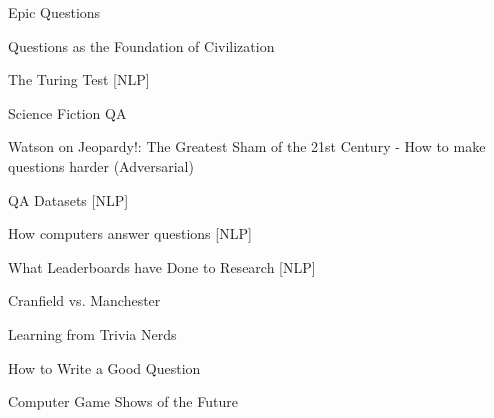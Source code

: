 Epic Questions

Questions as the Foundation of Civilization

The Turing Test [NLP]

Science Fiction QA

Watson on Jeopardy!: The Greatest Sham of the 21st Century 
 - How to make questions harder (Adversarial)

QA Datasets [NLP]

How computers answer questions [NLP]

What Leaderboards have Done to Research [NLP]

Cranfield vs. Manchester

Learning from Trivia Nerds

How to Write a Good Question

Computer Game Shows of the Future
